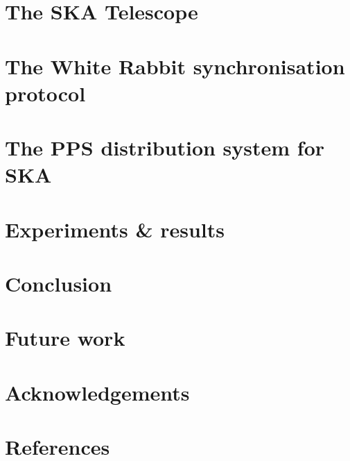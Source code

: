 \documentclass[review]{elsarticle}
\begin{document}


\section{The SKA Telescope} \label{sec:ska}



\section{The White Rabbit synchronisation protocol} \label{sec:wr}



\section{The PPS distribution system for SKA} \label{sec:ska-pps-system}



\section{Experiments \& results} \label{sec:experiments}



\section{Conclusion} \label{sec:conclusion}



\section{Future work} \label{sec:future-work}



\section{Acknowledgements} \label{sec:acknowledgments}



\section*{References}\label{sec:references}


\end{document}
